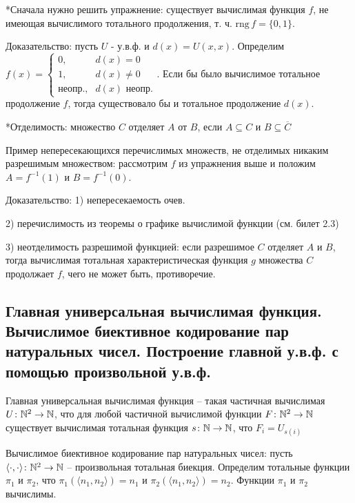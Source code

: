 \documentclass[a4paper, 10pt]{article}
\newcommand{\rng}{\text{rng}\,}
\begin{document}
*Сначала нужно решить упражнение: существует вычислимая функция $f$, не имеющая вычислимого тотального продолжения, т. ч. $\rng f = \{0, 1\}$.

Доказательство: пусть $U$ - у.в.ф. и $d(x)=U(x,x)$. Определим $f(x)=\begin{cases}
    0,&d(x)=0 \\
    1,&d(x)\not=0 \\
    \text{неопр.,}&d(x)\text{ неопр.}
\end{cases}$. Если бы было вычислимое тотальное продолжение $f$, тогда существовало бы и тотальное продолжение $d(x)$.

\hfill

*Отделимость: множество $C$ отделяет $A$ от $B$, если $A\subseteq C$ и $B\subseteq \overline{C}$

Пример непересекающихся перечислимых множеств, не отделимых никаким разрешимым множеством: рассмотрим $f$ из упражнения выше и положим $A=f^{-1}(1)$ и $B=f^{-1}(0)$.

Доказательство: 1) непересекаемость очев.

2) перечислимость из теоремы о графике вычислимой функции (см. билет 2.3)

3) неотделимость разрешимой функцией: если разрешимое $C$ отделяет $A$ и $B$, тогда вычислимая тотальная характеристическая функция $g$ множества $C$ продолжает $f$, чего не может быть, противоречие.

\subsection{Главная универсальная вычислимая функция. Вычислимое биективное кодирование пар натуральных чисел. Построение главной у.в.ф. с помощью произвольной у.в.ф.}

Главная универсальная вычислимая функция -- такая частичная вычислимая $U\colon\mathbb{N}^2 \to\mathbb{N}$, что для любой частичной вычислимой функции $F\colon\mathbb{N}^2\to\mathbb{N}$ существует вычислимая тотальная функция $s\colon\mathbb{N}\to\mathbb{N}$, что $F_i=U_{s(i)}$

\hfill

Вычислимое биективное кодирование пар натуральных чисел: пусть $\langle \cdot,\cdot \rangle \colon \mathbb{N}^2 \to \mathbb{N}$ -- произвольная тотальная биекция. Определим тотальные функции $\pi_1$ и $\pi_2$, что $\pi_1(\langle n_1,n_2 \rangle)=n_1$ и $\pi_2(\langle n_1,n_2 \rangle)=n_2$. Функции $\pi_1$ и $\pi_2$ вычислимы.
\end{document}
